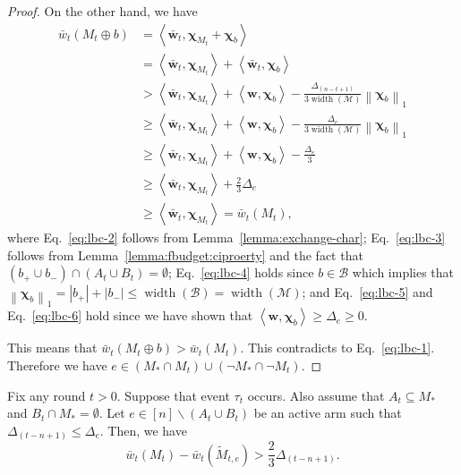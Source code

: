 \documentclass{article}
\newcommand{\M}{\mathcal M}
\newcommand{\B}{\mathcal B}
\newcommand{\del}{\backslash}
\DeclareMathOperator{\rank}{width}
\newcommand{\inn}[1]{\left\langle #1 \right\rangle}
\newcommand{\nor}[1]{\left\|#1\right\|}
\renewcommand{\vec}[1]{\boldsymbol{#1}}
\begin{document}
\begin{proof}
On the other hand, we have
\begin{align}
\bar w_t(M_t\oplus b) &= \inn{\vec{\bar w}_t, \vec \chi_{M_t} + \vec \chi_b} \label{eq:lbc-2}\\
									    &= \inn{\vec{\bar w}_t, \vec \chi_{M_t}} + \inn{\vec{\bar w}_t, \vec \chi_b}\nonumber\\
									    &> \inn{\vec{\bar w}_t, \vec \chi_{M_t}} + \inn{\vec w,\vec\chi_b} - \frac{\Delta_{(n-t+1)}}{3\rank(\M)} \nor{\vec\chi_b}_1 \label{eq:lbc-3} \\
										  &\ge \inn{\vec{\bar w}_t, \vec \chi_{M_t}} + \inn{\vec w,\vec\chi_b} - \frac{\Delta_{e}}{3\rank(\M)} \nor{\vec\chi_b}_1
										  \nonumber\\
										  &\ge \inn{\vec{\bar w}_t, \vec \chi_{M_t}} + \inn{\vec w,\vec\chi_b} - \frac{\Delta_e}{3}
										  \label{eq:lbc-4}\\
										  &\ge \inn{\vec{\bar w}_t, \vec \chi_{M_t}} + \frac{2}3 \Delta_e \label{eq:lbc-5}\\
										  &\ge \inn{\vec{\bar w}_t, \vec \chi_{M_t}} = \bar w_t(M_t), \label{eq:lbc-6}
\end{align}
where Eq.~\eqref{eq:lbc-2} follows from Lemma~\ref{lemma:exchange-char};
Eq.~\eqref{eq:lbc-3} follows from Lemma~\ref{lemma:fbudget:ciproerty} and the fact that $(b_+\cup b_-)\cap (A_t\cup B_t)=\emptyset$;
Eq.~\eqref{eq:lbc-4} holds since $b\in \B$ which implies that $\nor{\vec\chi_b}_1 = |b_+|+|b_-|\le\rank(\B)=\rank(\M)$;
and Eq.~\eqref{eq:lbc-5} and Eq.~\eqref{eq:lbc-6} hold since we have shown that $\inn{\vec w, \vec \chi_b} \ge \Delta_e \ge 0$.

This means that $\bar w_t(M_t \oplus b) > \bar w_t(M_t)$. 
This contradicts to Eq.~\eqref{eq:lbc-1}.
Therefore we have $e\in (M_* \cap M_t) \cup ( \neg M_* \cap \neg M_t)$.


\end{proof}

\begin{lemma}
\label{lemma-budget-c}
Fix any round $t>0$. 
Suppose that event $\tau_t$ occurs.
Also assume that $A_t \subseteq M_*$ and $B_t \cap M_* = \emptyset$.
Let $e \in [n] \del (A_t\cup B_t)$ be an active arm such that $\Delta_{(t-n+1)} \le \Delta_e$.
Then, we have 
$$
\bar w_t(M_t) - \bar w_t(\tilde M_{t,e}) > \frac23 \Delta_{(t-n+1)}.
$$
\end{lemma}
\end{document}
